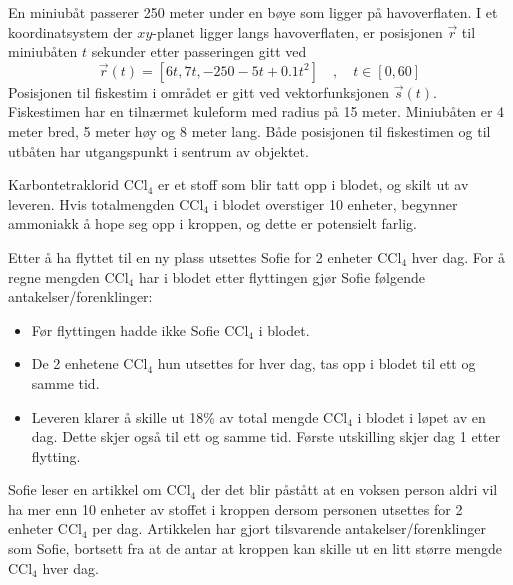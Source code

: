 En miniubåt passerer 250 meter under en bøye som ligger på havoverflaten.
I et koordinatsystem der $xy$-planet ligger langs havoverflaten, er posisjonen $\vec{r}$ til miniubåten $t$ sekunder etter passeringen gitt ved
\[ \vec{r}(t) = [6t, 7t, -250 - 5t + 0.1t^2]\quad, \quad t \in [0, 60] \]
Posisjonen til fiskestim i området er gitt ved vektorfunksjonen $\vec{s}(t)$. Fiskestimen har en tilnærmet kuleform med radius på 15 meter. Miniubåten er 4 meter bred,
5 meter høy og 8 meter lang. Både posisjonen til fiskestimen og til utbåten har utgangspunkt i sentrum av objektet.

\newpage
{}
Karbontetraklorid $\text{CCl}_4$ er et stoff som blir tatt opp i blodet, og skilt ut av leveren. Hvis totalmengden $\text{CCl}_4$ i blodet overstiger 10 enheter, begynner ammoniakk å
hope seg opp i kroppen, og dette er potensielt farlig. \os

Etter å ha flyttet til en ny plass utsettes Sofie for 2 enheter $\text{CCl}_4$ hver dag.  For å regne mengden $\text{CCl}_4$ har i blodet etter flyttingen gjør Sofie følgende antakelser/forenklinger:
\begin{itemize}
	\item Før flyttingen hadde ikke Sofie $\text{CCl}_4$ i blodet.
	\item De 2 enhetene $\text{CCl}_4$ hun utsettes for hver dag, tas opp i blodet til ett og samme tid.
	\item Leveren klarer å skille ut 18\% av total mengde $\text{CCl}_4$ i blodet i løpet av en dag. Dette skjer også til ett og samme tid. Første utskilling skjer dag 1 etter flytting.
\end{itemize}

Sofie leser en artikkel om $\text{CCl}_4$ der det blir påstått at en voksen person aldri vil ha mer enn 10 enheter av stoffet i kroppen dersom personen utsettes for 2 enheter $\text{CCl}_4$ per dag. Artikkelen har gjort tilsvarende antakelser/forenklinger som Sofie, bortsett fra at de antar at kroppen kan skille ut en litt større mengde $\text{CCl}_4$ hver dag.


